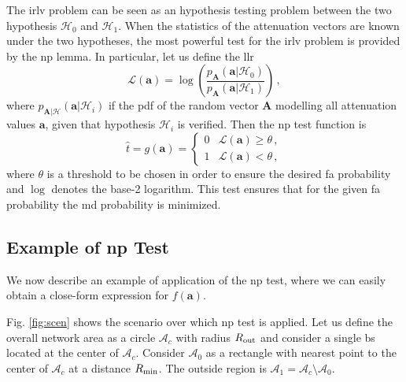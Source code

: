 \documentclass[conference,final]{IEEEtran}
\begin{document}
The \ac{irlv} problem can be seen as an hypothesis testing problem between the two hypothesis $\mathcal H_0$ and $\mathcal H_1$. When the statistics of the attenuation vectors are known under the two hypotheses, the most powerful test for the \ac{irlv} problem is provided by the \ac{np} lemma. In particular, let us  define the \ac{llr}
\begin{equation}\label{eq:lr}
    \mathcal{L}{(\bm a)}=\log\left(\frac{p_{\bm A}(\bm a|\mathcal{H}_0)}{p_{\bm A}(\bm a|\mathcal{H}_1)}\right)\,,
\end{equation}
where $p_{\bm A|\mathcal{H}}(\bm a|\mathcal{H}_i)$ if the \ac{pdf} of the random vector $\bm A$ modelling all attenuation values $\bm a$, given that hypothesis $\mathcal H_i$ is verified. Then the \ac{np} test function is 
\begin{equation}
\label{eq:thrOpt}
    \hat{t} = g(\bm a) = \begin{cases}
    0 & \mathcal{L}{(\bm a)} \geq \theta\,, \\ 
    1 & \mathcal{L}{(\bm a)} < \theta\,, 
    \end{cases}
\end{equation}
where $\theta$ is a threshold to be chosen in order to ensure the desired \ac{fa} probability and $\log$ denotes the base-2 logarithm. This test ensures that for the given \ac{fa} probability the \ac{md} probability is minimized. 

\subsection{Example of \ac{np} Test}
\label{sec:los}
We now describe an example of application of the \ac{np} test, where we can easily obtain a close-form expression for $f(\bm a)$. 

Fig. \ref{fig:scen} shows the scenario over which \ac{np} test is applied. Let us define the overall network area as a circle $\mathcal{A}_c$ with radius $R_{\rm out}$ and consider a single \ac{bs} located at the center of $\mathcal{A}_c$. Consider $\mathcal{A}_{0}$ as a rectangle with nearest point to the center of $\mathcal{A}_c$ at a distance $R_{\rm min}$. The outside region is $\mathcal{A}_1 = \mathcal{A}_c \setminus \mathcal{A}_0$.
\end{document}
